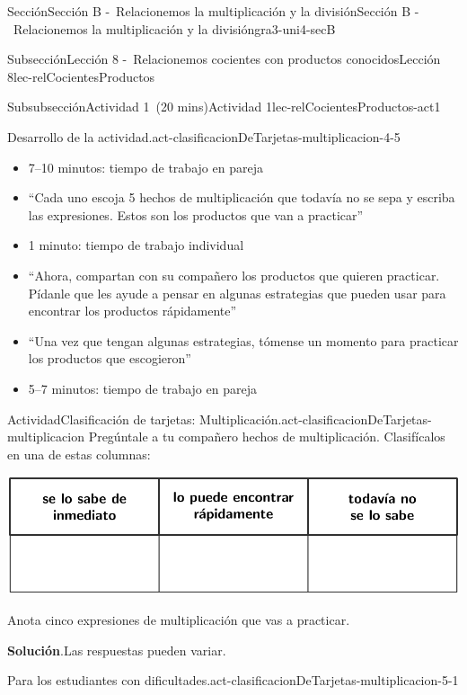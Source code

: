 \documentclass[oneside,10pt,]{article}
\newcommand{\blocktitlefont}{\relax}
\begin{document}
\begin{sectionptx}{Sección}{Sección B -~Relacionemos la multiplicación y la división}{}{Sección B -~Relacionemos la multiplicación y la división}{}{}{gra3-uni4-secB}
\begin{subsectionptx}{Subsección}{Lección 8 -~Relacionemos cocientes con productos conocidos}{}{Lección 8}{}{}{lec-relCocientesProductos}
\begin{subsubsectionptx}{Subsubsección}{Actividad 1~(20 mins)}{}{Actividad 1}{}{}{lec-relCocientesProductos-act1}
\begin{paragraphs}{Desarrollo de la actividad.}{act-clasificacionDeTarjetas-multiplicacion-4-5}
\begin{itemize}[label=\textbullet]
\item{}7–10 minutos: tiempo de trabajo en pareja%
\item{}``Cada uno escoja 5 hechos de multiplicación que todavía no se sepa y escriba las expresiones. Estos son los productos que van a practicar''%
\item{}1 minuto: tiempo de trabajo individual%
\item{}``Ahora, compartan con su compañero los productos que quieren practicar. Pídanle que les ayude a pensar en algunas estrategias que pueden usar para encontrar los productos rápidamente''%
\item{}``Una vez que tengan algunas estrategias, tómense un momento para practicar los productos que escogieron''%
\item{}5–7 minutos: tiempo de trabajo en pareja%
\end{itemize}
\end{paragraphs}%
\begin{activity}{Actividad}{Clasificación de tarjetas: Multiplicación.}{act-clasificacionDeTarjetas-multiplicacion}%
Pregúntale a tu compañero hechos de multiplicación. Clasifícalos en una de estas columnas:%
\begin{image}{0}{1}{0}{}%
\includegraphics[width=\linewidth]{external/tikz-source/clasificacionTarjetas-mult.pdf}
\end{image}%
Anota cinco expresiones de multiplicación que vas a practicar.%
\par\smallskip%
\noindent\textbf{\blocktitlefont Solución}.\hypertarget{act-clasificacionDeTarjetas-multiplicacion-3}{}\quad{}Las respuestas pueden variar.%
\end{activity}%
%
%
\par
\begin{paragraphs}{Para los estudiantes con dificultades.}{act-clasificacionDeTarjetas-multiplicacion-5-1}%

\end{paragraphs}
\end{subsubsectionptx}
\end{subsectionptx}
\end{sectionptx}
\end{document}
